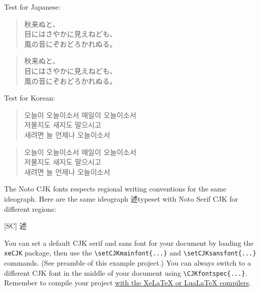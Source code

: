 \documentclass{article}
\begin{document}
Test for Japanese:
\begin{multicols}{2}
\begin{verse}
秋来ぬと、\\
目にはさやかに見えねども、\\
風の音にぞおどろかれぬる。
\end{verse}

\begin{verse}
秋来ぬと、\\
目にはさやかに見えねども、\\
風の音にぞおどろかれぬる。
\end{verse}
\end{multicols}


Test for Korean:
\begin{multicols}{2}
\begin{verse}
오늘이 오늘이소서 매일이 오늘이소서\\
저물지도 새지도 말으시고\\
새려면 늘 언제나 오늘이소서
\end{verse}

\begin{verse}
오늘이 오늘이소서 매일이 오늘이소서\\
저물지도 새지도 말으시고\\
새려면 늘 언제나 오늘이소서
\end{verse}
\end{multicols}

The Noto CJK fonts respects regional writing conventions for the same ideograph. Here are the same ideograph 述typeset with Noto Serif CJK for different regions:

\begin{center}
[SC] {述}
\end{center}

You can set a default CJK serif and sans font for your document by loading the \texttt{xeCJK} package, then use the \verb|\setCJKmainfont{...}| and \verb|\setCJKsansfont{...}| commands. (See preamble of this example project.) You can always switch to a different CJK font in the middle of your document using \verb|\CJKfontspec{...}|. Remember to compile your project \href{https://www.overleaf.com/learn/latex/Choosing_a_LaTeX_Compiler}{with the XeLaTeX or LuaLaTeX compilers}.
\end{document}
